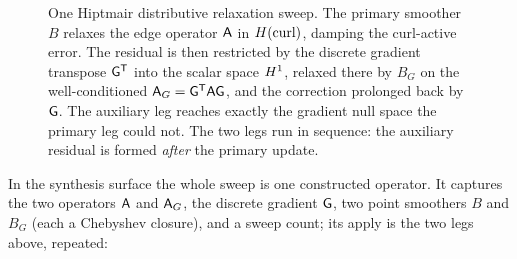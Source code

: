 \begin{figure}[t]
\centering
{}
\caption[Hiptmair primary + auxiliary relaxation]{One Hiptmair distributive
relaxation sweep. The primary smoother $B$ relaxes the edge operator $\mathsf{A}$ in
$H(\mathrm{curl})$, damping the curl-active error. The residual is then restricted by the
discrete gradient transpose $\mathsf{G}^{\mathsf T}$ into the scalar space $H^1$,
relaxed there by $B_G$ on the well-conditioned $\mathsf{A}_G=\mathsf{G}^{\mathsf T}\mathsf{A}\mathsf{G}$,
and the correction prolonged back by $\mathsf{G}$. The auxiliary leg reaches exactly the
gradient null space the primary leg could not. The two legs run in sequence: the
auxiliary residual is formed \emph{after} the primary update.}
\label{fig:smoo-hiptmair}
\end{figure}

In the synthesis surface the whole sweep is one constructed operator. It captures
the two operators $\mathsf{A}$ and $\mathsf{A}_G$, the discrete gradient $\mathsf{G}$, two
point smoothers $B$ and $B_G$ (each a Chebyshev closure), and a sweep count; its
apply is the two legs above, repeated:

